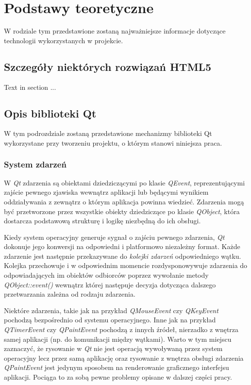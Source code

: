 \documentclass[polish]{inz}
\begin{document}
\chapter{Podstawy teoretyczne}
W rodziale tym przedstawione zostaną najważniejsze informacje dotyczące technologii wykorzystanych w projekcie. 

\section{Szczegóły niektórych rozwiązań HTML5}
Text in section ...

\section{Opis biblioteki Qt}
W tym podrozdziale zostaną przedstawione mechanizmy biblioteki Qt wykorzystane przy tworzeniu projektu, o którym stanowi niniejsza praca. 

\subsection{System zdarzeń}
W \emph{Qt} zdarzenia są obiektami dziedziczącymi po klasie \emph{QEvent}, reprezentującymi zajście pewnego zjawiska wewnątrz aplikacji lub będącymi wynikiem oddziaływania z zewnątrz o którym aplikacja powinna wiedzieć. Zdarzenia mogą być przetworzone przez wszystkie obiekty dziedziczące po klasie \emph{QObject}, która dostarcza podstawową strukturę i logikę niezbędną do ich obsługi. 

Kiedy system operacyjny generuje sygnał o zajściu pewnego zdarzenia, \emph{Qt} dokonuje jego konwersji na odpowiedni i platformowo niezależny format. Każde zdarzenie jest następnie przekazywane do \emph{kolejki zdarzeń} odpowiedniego wątku. Kolejka przechowuje i w odpowiednim momencie rozdysponowywuje zdarzenia do odpowiadających im obiektów odbiorców poprzez wywołanie metody \emph{QObject::event()} wewnątrz której następuje decyzja dotycząca dalszego przetwarzania zależna od rodzaju zdarzenia. 

Niektóre zdarzenia, takie jak na przykład \emph{QMouseEvent} czy \emph{QKeyEvent} pochodzą bezpośrednio od systemu operacyjnego. Inne jak na przykład \emph{QTimerEvent} czy \emph{QPaintEvent} pochodzą z innych źródeł, nierzadko z wnętrza samej aplikacji (np. do komunikacji między wątkami). Warto w tym miejscu zaznaczyć, że rysowanie w \emph{Qt} nie jest operacją wywoływaną przez system operacyjny lecz przez samą aplikację oraz rysowanie z wnętrza obsługi zdarzenia \emph{QPaintEvent} jest jedynym sposobem na renderowanie graficznego interfejsu aplikacji. Pociąga to za sobą pewne problemy opisane w dalszej części pracy.
\end{document}
